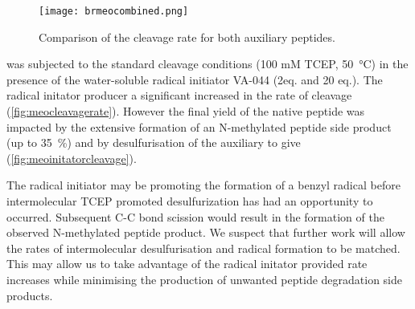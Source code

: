     \begin{figure}[!htpb]
        \texttt{[image: brmeocombined.png]}
        \caption{Comparison of the cleavage rate for both auxiliary peptides.}
        \label{fig:brmeocleavage}
    \end{figure}

     was subjected to the standard cleavage conditions (100 mM TCEP, \SI{50}{\celsius}) in the presence of the water-soluble radical initiator VA-044 (2eq. and 20 eq.). The radical initator producer a significant increased in the rate of cleavage (\ref{fig:meocleavagerate}). However the final yield of the native peptide was impacted by the extensive formation of an N-methylated peptide side product  (up to \SI{35}{\percent}) and by desulfurisation of the auxiliary to give  (\ref{fig:meoinitatorcleavage}).

    The radical initiator may be promoting the formation of a benzyl radical before intermolecular TCEP promoted desulfurization has had an opportunity to occurred.  Subsequent C-C bond scission would result in the formation of the observed N-methylated peptide product. We suspect that further work will allow the rates of intermolecular desulfurisation and radical formation to be matched. This may allow us to take advantage of the radical initator provided rate increases while minimising the production of unwanted peptide degradation side products.




